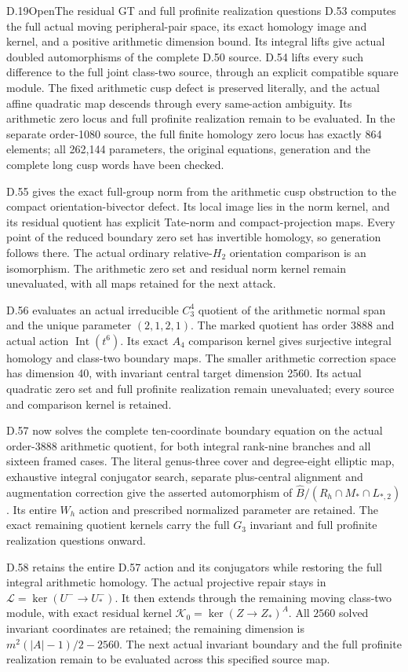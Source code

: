 \begin{statement}{D.19}{Open}{The residual GT and full profinite realization questions}
D.53 computes the full actual moving peripheral-pair space,
its exact homology image and kernel, and a positive arithmetic
dimension bound. Its integral lifts give actual doubled
automorphisms of the complete D.50 source. D.54 lifts every
such difference to the full joint class-two source, through
an explicit compatible square module. The fixed arithmetic
cusp defect is preserved literally, and the actual affine
quadratic map descends through every same-action ambiguity.
Its arithmetic zero locus and full profinite realization
remain to be evaluated. In the separate order-1080 source,
the full finite homology zero locus has exactly 864 elements;
all 262,144 parameters, the original equations, generation
and the complete long cusp words have been checked.


D.55 gives the exact full-group norm from the arithmetic
cusp obstruction to the compact orientation-bivector defect.
Its local image lies in the norm kernel, and its residual
quotient has explicit Tate-norm and compact-projection maps.
Every point of the reduced boundary zero set has invertible
homology, so generation follows there. The actual ordinary
relative-$H_2$ orientation comparison is an isomorphism.
The arithmetic zero set and residual norm kernel remain
unevaluated, with all maps retained for the next attack.


D.56 evaluates an actual irreducible $C_3^4$ quotient of
the arithmetic normal span and the unique parameter $(2,1,2,1)$.
The marked quotient has order 3888 and actual action
$\operatorname{Int}(t^6)$. Its exact $A_4$ comparison kernel
gives surjective integral homology and class-two boundary maps.
The smaller arithmetic correction space has dimension 40,
with invariant central target dimension 2560. Its actual
quadratic zero set and full profinite realization remain
unevaluated; every source and comparison kernel is retained.


D.57 now solves the complete ten-coordinate boundary equation
on the actual order-$3888$ arithmetic quotient, for both integral
rank-nine branches and all sixteen framed cases. The literal
genus-three cover and degree-eight elliptic map, exhaustive integral
conjugator search, separate plus-central alignment and augmentation
correction give the asserted automorphism of
$\widehat B/(R_h\cap M_*\cap L_{*,2})$.
Its entire $W_h$ action and prescribed normalized parameter are
retained. The exact remaining quotient kernels carry the full
$G_3$ invariant and full profinite realization questions onward.


D.58 retains the entire D.57 action and its conjugators while
restoring the full integral arithmetic homology. The actual
projective repair stays in
$\mathcal L=\ker(U^-\to U_*^-)$.
It then extends through the remaining moving class-two module,
with exact residual kernel
$\mathcal K_0=\ker(Z\to Z_*)^A$.
All $2560$ solved invariant coordinates are retained; the remaining
dimension is $m^2(|A|-1)/2-2560$.
The next actual invariant boundary and the full profinite realization
remain to be evaluated across this specified source map.



\end{statement}
